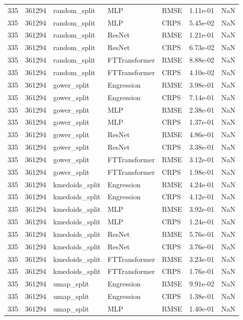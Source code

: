 \begin{tabular}{rrlllrr}
335 & 361294 & random\_split & MLP & RMSE & 1.11e-01 & NaN \\
335 & 361294 & random\_split & MLP & CRPS & 5.45e-02 & NaN \\
335 & 361294 & random\_split & ResNet & RMSE & 1.21e-01 & NaN \\
335 & 361294 & random\_split & ResNet & CRPS & 6.73e-02 & NaN \\
335 & 361294 & random\_split & FTTransformer & RMSE & 8.88e-02 & NaN \\
335 & 361294 & random\_split & FTTransformer & CRPS & 4.10e-02 & NaN \\
335 & 361294 & gower\_split & Engression & RMSE & 3.98e-01 & NaN \\
335 & 361294 & gower\_split & Engression & CRPS & 7.14e-01 & NaN \\
335 & 361294 & gower\_split & MLP & RMSE & 2.38e-01 & NaN \\
335 & 361294 & gower\_split & MLP & CRPS & 1.37e-01 & NaN \\
335 & 361294 & gower\_split & ResNet & RMSE & 4.86e-01 & NaN \\
335 & 361294 & gower\_split & ResNet & CRPS & 3.38e-01 & NaN \\
335 & 361294 & gower\_split & FTTransformer & RMSE & 3.12e-01 & NaN \\
335 & 361294 & gower\_split & FTTransformer & CRPS & 1.98e-01 & NaN \\
335 & 361294 & kmedoids\_split & Engression & RMSE & 4.24e-01 & NaN \\
335 & 361294 & kmedoids\_split & Engression & CRPS & 4.12e-01 & NaN \\
335 & 361294 & kmedoids\_split & MLP & RMSE & 3.92e-01 & NaN \\
335 & 361294 & kmedoids\_split & MLP & CRPS & 1.24e-01 & NaN \\
335 & 361294 & kmedoids\_split & ResNet & RMSE & 5.76e-01 & NaN \\
335 & 361294 & kmedoids\_split & ResNet & CRPS & 3.76e-01 & NaN \\
335 & 361294 & kmedoids\_split & FTTransformer & RMSE & 3.23e-01 & NaN \\
335 & 361294 & kmedoids\_split & FTTransformer & CRPS & 1.76e-01 & NaN \\
335 & 361294 & umap\_split & Engression & RMSE & 9.91e-02 & NaN \\
335 & 361294 & umap\_split & Engression & CRPS & 1.38e-01 & NaN \\
335 & 361294 & umap\_split & MLP & RMSE & 1.40e-01 & NaN \\

\end{tabular}
